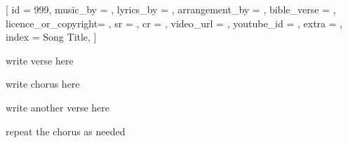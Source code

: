 [
    id                  = {999},
    music_by            = {}, %
    lyrics_by           = {}, %
    arrangement_by      = {}, %
    bible_verse         = {},
    licence_or_copyright= {},
    sr                  = {},
    cr                  = {},
    video_url           = {}, %
    youtube_id          = {}, %
    extra               = {},
    index               = {Song Title},
]

\beginverse
write verse here
\endverse

\beginchorus
write chorus here
\endchorus

\beginverse
write another verse here
\endverse

\beginchorus
repeat the chorus as needed
\endchorus

\endsong
